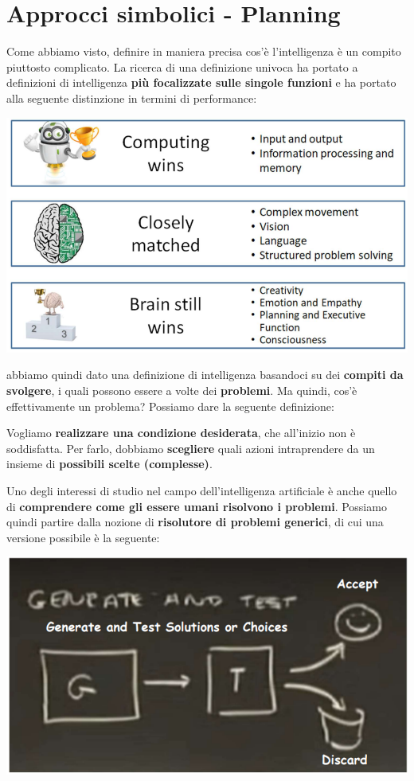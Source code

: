 \documentclass[12pt]{article}
\begin{document}
\section{Approcci simbolici - Planning}
Come abbiamo visto, definire in maniera precisa cos'è l'intelligenza è un compito piuttosto complicato.
La ricerca di una definizione univoca ha portato a definizioni di intelligenza \textbf{più focalizzate sulle singole funzioni} e ha portato alla seguente distinzione in termini di performance:
\begin{center}
    \includegraphics[width = 0.80\linewidth]{Images/18.PNG}
\end{center}
abbiamo quindi dato una definizione di intelligenza basandoci su dei \textbf{compiti da svolgere}, i quali possono essere a volte dei \textbf{problemi}.
Ma quindi, cos'è effettivamente un problema? Possiamo dare la seguente definizione:
\begin{center}
    Vogliamo \textbf{realizzare una condizione desiderata}, che all'inizio non è soddisfatta. Per farlo, dobbiamo \textbf{scegliere} quali azioni intraprendere da un insieme di \textbf{possibili scelte (complesse)}.
\end{center}
Uno degli interessi di studio nel campo dell'intelligenza artificiale è anche quello di \textbf{comprendere come gli essere umani risolvono i problemi}.
Possiamo quindi partire dalla nozione di \textbf{risolutore di problemi generici}, di cui una versione possibile è la seguente:
\begin{center}
    \includegraphics[width = 0.60\linewidth]{Images/19.PNG}
\end{center}
\end{document}
